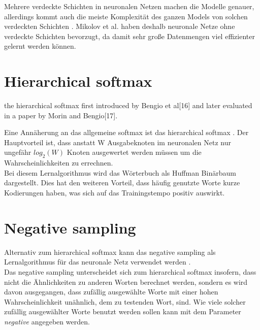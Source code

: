 \documentclass[12pt,a4paper]{report}
\begin{document}
	Mehrere verdeckte Schichten in neuronalen Netzen machen die Modelle genauer, allerdings kommt auch die meiste Komplexität des ganzen Models von solchen verdeckten Schichten \citep{DBLP:journals/corr/abs-1301-3781}. Mikolov et al. haben deshalb neuronale Netze ohne verdeckte Schichten bevorzugt, da damit sehr große Datenmengen viel effizienter gelernt werden können.\\
	
	\section{Hierarchical softmax}
	 the hierarchical softmax first introduced by Bengio et al[16] and
later evaluated in a paper by Morin and Bengio[17].


	Eine Annäherung an das allgemeine softmax ist das hierarchical softmax \citep{DBLP:journals/corr/MikolovSCCD13}. Der Hauptvorteil ist, dass anstatt W Ausgabeknoten im neuronalen Netz nur ungefähr $log_2(W) $ Knoten ausgewertet werden müssen um die Wahrscheinlichkeiten zu errechnen. \\
	Bei diesem Lernalgorithmus wird das Wörterbuch als Huffman Binärbaum dargestellt. Dies hat den weiteren Vorteil, dass häufig genutzte Worte kurze Kodierungen haben, was sich auf das Trainingstempo positiv auswirkt.\\
	
	\section{Negative sampling}
	\label{sec:negativeSampling}
	Alternativ zum hierarchical softmax kann das negative sampling als Lernalgorithmus für das neuronale Netz verwendet werden \citep{DBLP:journals/corr/MikolovSCCD13}.\\
	Das negative sampling unterscheidet sich zum hierarchical softmax insofern, dass nicht die Ähnlichkeiten zu anderen Worten berechnet werden, sondern es wird davon ausgegangen, dass zufällig ausgewählte Worte mit einer hohen Wahrscheinlichkeit unähnlich, dem zu testenden Wort, sind. Wie viele solcher zufällig ausgewählter Worte benutzt werden sollen kann mit dem Parameter \textit{negative} angegeben werden.\\
	
	
\end{document}

